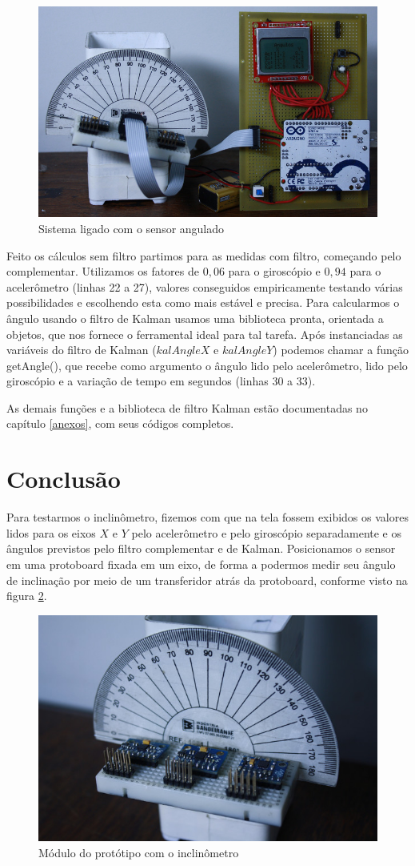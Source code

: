 \documentclass[a4paper,12pt]{article}
\begin{document}
\begin{figure}[H]
\centering
\includegraphics[width=.7\textwidth]{img/ligado.jpg}
\caption{Sistema ligado com o sensor angulado}
\label{ligado}
\end{figure}

Feito os cálculos sem filtro partimos para as medidas com filtro, começando pelo complementar. Utilizamos os fatores de $0,06$ para o giroscópio e $0,94$ para o acelerômetro (linhas 22 a 27), valores conseguidos empiricamente testando várias possibilidades e escolhendo esta como mais estável e precisa. Para calcularmos o ângulo usando o filtro de Kalman usamos uma biblioteca pronta, orientada a objetos, que nos fornece o ferramental ideal para tal tarefa. Após instanciadas as variáveis do filtro de Kalman ($kalAngleX$ e $kalAngleY$) podemos chamar a função getAngle(), que recebe como argumento o ângulo lido pelo acelerômetro, lido pelo giroscópio e a variação de tempo em segundos (linhas 30 a 33).

As demais funções e a biblioteca de filtro Kalman estão documentadas no capítulo \ref{anexos}, com seus códigos completos.

\section{Conclusão}

Para testarmos o  inclinômetro, fizemos com que na tela fossem exibidos os valores lidos para os eixos $X$ e $Y$ pelo acelerômetro e pelo giroscópio separadamente e os ângulos previstos pelo filtro complementar e de Kalman. Posicionamos o sensor em uma protoboard fixada em um eixo, de forma a podermos medir seu ângulo de inclinação por meio de um transferidor atrás da protoboard, conforme visto na figura \ref{detalhe}.

\begin{figure}[H]
\centering
\includegraphics[width=.7\textwidth]{img/detalhe.jpg}
\caption{Módulo do protótipo com o inclinômetro}
\label{detalhe}
\end{figure}
\end{document}
